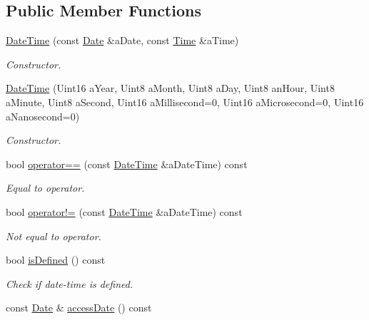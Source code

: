 \subsection*{Public Member Functions}
\begin{DoxyCompactItemize}
\item 
\hyperlink{classostk_1_1physics_1_1time_1_1_date_time_a974b5a7581ae7461ccf0e6ab85e42633}{Date\+Time} (const \hyperlink{classostk_1_1physics_1_1time_1_1_date}{Date} \&a\+Date, const \hyperlink{classostk_1_1physics_1_1time_1_1_time}{Time} \&a\+Time)
\begin{DoxyCompactList}\small\item\em Constructor. \end{DoxyCompactList}\item 
\hyperlink{classostk_1_1physics_1_1time_1_1_date_time_ab73b68943ff5020a103794fc0c5481f0}{Date\+Time} (Uint16 a\+Year, Uint8 a\+Month, Uint8 a\+Day, Uint8 an\+Hour, Uint8 a\+Minute, Uint8 a\+Second, Uint16 a\+Millisecond=0, Uint16 a\+Microsecond=0, Uint16 a\+Nanosecond=0)
\begin{DoxyCompactList}\small\item\em Constructor. \end{DoxyCompactList}\item 
bool \hyperlink{classostk_1_1physics_1_1time_1_1_date_time_a8ffda673aa698ebe33cd4c4d4a041ef6}{operator==} (const \hyperlink{classostk_1_1physics_1_1time_1_1_date_time}{Date\+Time} \&a\+Date\+Time) const
\begin{DoxyCompactList}\small\item\em Equal to operator. \end{DoxyCompactList}\item 
bool \hyperlink{classostk_1_1physics_1_1time_1_1_date_time_ae96358ed48be6bb4325d3f3408a8ab5c}{operator!=} (const \hyperlink{classostk_1_1physics_1_1time_1_1_date_time}{Date\+Time} \&a\+Date\+Time) const
\begin{DoxyCompactList}\small\item\em Not equal to operator. \end{DoxyCompactList}\item 
bool \hyperlink{classostk_1_1physics_1_1time_1_1_date_time_a2fd2deab390516483e1757c45ae81282}{is\+Defined} () const
\begin{DoxyCompactList}\small\item\em Check if date-\/time is defined. \end{DoxyCompactList}\item 
const \hyperlink{classostk_1_1physics_1_1time_1_1_date}{Date} \& \hyperlink{classostk_1_1physics_1_1time_1_1_date_time_a27b1ada0ea5f28fe6dcd131cdd4e2a5c}{access\+Date} () const

\end{DoxyCompactItemize}
